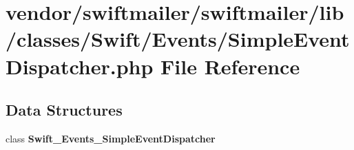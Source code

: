 \section{vendor/swiftmailer/swiftmailer/lib/classes/\+Swift/\+Events/\+Simple\+Event\+Dispatcher.php File Reference}
\label{_simple_event_dispatcher_8php}
\subsection*{Data Structures}
\begin{DoxyCompactItemize}
\item 
class {\bf Swift\+\_\+\+Events\+\_\+\+Simple\+Event\+Dispatcher}
\end{DoxyCompactItemize}
